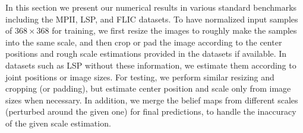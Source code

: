 \documentclass[10pt,twocolumn,letterpaper]{article}
\newcommand\myworries[1]{\textcolor{red}{#1}}
\begin{document}

In this section we present our numerical results in various standard benchmarks including the MPII, LSP, and FLIC datasets. To have normalized input samples of $368 \times 368$ for training, we first resize the images to roughly make the samples into the same scale, and then
crop or pad the image according to the center positions and rough scale estimations provided in the datasets if available. In datasets such as LSP without these information, we estimate them according to joint positions or image sizes. For testing, we perform similar resizing and cropping (or padding), but estimate center position and scale only from image sizes when necessary. In addition, we merge the belief maps from different scales (perturbed around the given one) for final predictions, to handle the inaccuracy of the given scale estimation.
\end{document}
